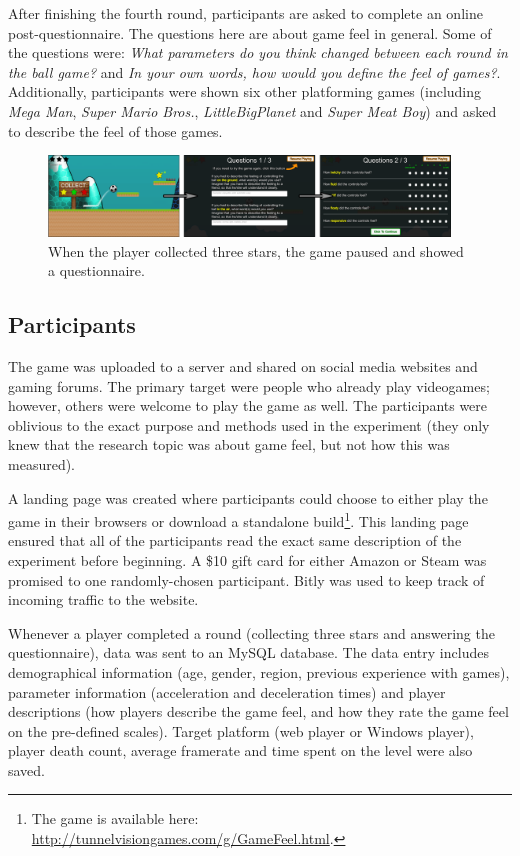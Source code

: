 After finishing the fourth round, participants are asked to complete an online post-questionnaire. The questions here are about game feel in general. Some of the questions were: \textit{What parameters do you think changed between each round in the ball game?} and \textit{In your own words, how would you define the feel of games?}. Additionally, participants were shown six other platforming games (including \textit{Mega Man}, \textit{Super Mario Bros.}, \textit{LittleBigPlanet} and \textit{Super Meat Boy}) and asked to describe the feel of those games.

\begin{figure}[htbp]
\centering
\includegraphics[width=0.95\textwidth]{Pics/game_phases}
\caption{When the player collected three stars, the game paused and showed a questionnaire.}
\label{fig:questionnaire}
\end{figure}

\subsection{Participants}
The game was uploaded to a server and shared on social media websites and gaming forums. The primary target were people who already play videogames; however, others were welcome to play the game as well. 
The participants were oblivious to the exact purpose and methods used in the experiment (they only knew that the research topic was about game feel, but not how this was measured).

A landing page was created where participants could choose to either play the game in their browsers or download a standalone build\footnote{The game is available here: \\ \url{http://tunnelvisiongames.com/g/GameFeel.html}.}. This landing page ensured that all of the participants read the exact same description of the experiment before beginning. A \$10 gift card for either Amazon or Steam was promised to one randomly-chosen participant. Bitly \cite{bitly} was used to keep track of incoming traffic to the website.

Whenever a player completed a round (collecting three stars and answering the questionnaire), data was  sent to an MySQL database. The data entry includes demographical information (age, gender, region, previous experience with games), parameter information (acceleration and deceleration times) and player descriptions (how players describe the game feel, and how they rate the game feel on the pre-defined scales). Target platform (web player or Windows player), player death count, average framerate and time spent on the level were also saved.

